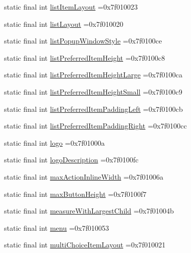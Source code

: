 \begin{DoxyCompactItemize}
\item 
static final int \hyperlink{classcheck_1_1test_1_1_r_1_1attr_a48d0f730be695f88e2bd71a69c0605d8}{list\+Item\+Layout} =0x7f010023
\item 
static final int \hyperlink{classcheck_1_1test_1_1_r_1_1attr_a73e1a0b98c2b12f1eb61b082e6a2c468}{list\+Layout} =0x7f010020
\item 
static final int \hyperlink{classcheck_1_1test_1_1_r_1_1attr_a41c863e947df5917e6718786a094a95d}{list\+Popup\+Window\+Style} =0x7f0100ce
\item 
static final int \hyperlink{classcheck_1_1test_1_1_r_1_1attr_a52420e9bc7b9f17c46ea9db6ff438295}{list\+Preferred\+Item\+Height} =0x7f0100c8
\item 
static final int \hyperlink{classcheck_1_1test_1_1_r_1_1attr_aabce9b732bbded79dc2e9a7fe1c57972}{list\+Preferred\+Item\+Height\+Large} =0x7f0100ca
\item 
static final int \hyperlink{classcheck_1_1test_1_1_r_1_1attr_a7399d398414e42a4ede3472ad153331c}{list\+Preferred\+Item\+Height\+Small} =0x7f0100c9
\item 
static final int \hyperlink{classcheck_1_1test_1_1_r_1_1attr_a5c876f039bc3f86b36be1456b3b363ae}{list\+Preferred\+Item\+Padding\+Left} =0x7f0100cb
\item 
static final int \hyperlink{classcheck_1_1test_1_1_r_1_1attr_a6d029d520bbcf01ad4cbef4eb98f7e94}{list\+Preferred\+Item\+Padding\+Right} =0x7f0100cc
\item 
static final int \hyperlink{classcheck_1_1test_1_1_r_1_1attr_a88dc33a575e7d1ce7a25603825bb87c0}{logo} =0x7f01000a
\item 
static final int \hyperlink{classcheck_1_1test_1_1_r_1_1attr_a8ef51fc670409d939be8dfc4555f3d68}{logo\+Description} =0x7f0100fc
\item 
static final int \hyperlink{classcheck_1_1test_1_1_r_1_1attr_aaf48db98a44dd24bf15a4986a845fa97}{max\+Action\+Inline\+Width} =0x7f01006a
\item 
static final int \hyperlink{classcheck_1_1test_1_1_r_1_1attr_abf227cf987d13435370f6f6bb9da1505}{max\+Button\+Height} =0x7f0100f7
\item 
static final int \hyperlink{classcheck_1_1test_1_1_r_1_1attr_a48262f79fe5c9e5f34747792592c3f00}{measure\+With\+Largest\+Child} =0x7f01004b
\item 
static final int \hyperlink{classcheck_1_1test_1_1_r_1_1attr_ae21b02ab52e1c279c8bcb58948757072}{menu} =0x7f010053
\item 
static final int \hyperlink{classcheck_1_1test_1_1_r_1_1attr_adbcd6700f598b96667bb355328873eee}{multi\+Choice\+Item\+Layout} =0x7f010021

\end{DoxyCompactItemize}
